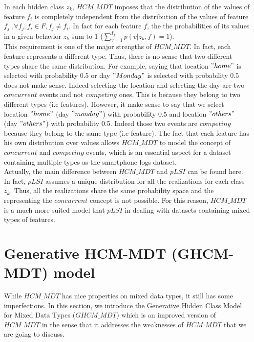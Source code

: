 In each hidden class $z_{k}$, $HCM\_MDT$ imposes that the distribution of the values of feature $f_{i}$ is completely independent from the distribution of the values of feature $f_{j}$ ,$\forall f_{j}, f_{i}\in F , f_{j}\neq f_{i}$. In fact for each feature $f$, the the probabilities of its values in a given behavior $z_{k}$ sum to $1$ ($\sum_{v=1}^{I_{f}}p(v|z_{k},f)=1$).
\\This requirement is one of the major strengths of $HCM\_MDT$. In fact, each feature represents a different type. Thus, there is no sense that two different types share the same distribution. For example, saying that location $"home"$ is selected with probability $0.5$ or day $"Monday"$ is selected with probability $0.5$ does not make sense. Indeed selecting the location and selecting the day are two $concurrent$ events and not $competing$ ones. This is because they belong to two different types (i.e features). However, it make sense to say that we select location $"home"$ (day $"monday"$) with probability 0.5 and location $"others"$ (day $"others"$) with probability 0.5. Indeed those two events are $competing$ because they belong to the same type (i.e feature). The fact that each feature has his own distribution over values allows $HCM\_MDT$ to model the concept of $concurrent$ and $competing$ events, which is an essential aspect for a dataset containing multiple types as the smartphone logs dataset.
\\Actually, the main difference between $HCM\_MDT$ and $pLSI$ can be found here. In fact, $pLSI$ assumes a unique distribution for all the realizations for each class $z_{k}$. Thus, all the realizations share the same probability space and the representing the $concurrent$ concept is not possible. For this reason, $HCM\_MDT$ is a much more suited model that $pLSI$ in dealing with datasets containing mixed types of features.






\section{Generative HCM-MDT (GHCM-MDT) model}
While $HCM\_MDT$ has nice properties on mixed data types, it still has some imperfections. In this section, we introduce the Generative Hidden Class Model for Mixed Data Types ($GHCM\_MDT$) which is an improved version of $HCM\_MDT$ in the sense that it addresses the weaknesses of $HCM\_MDT$ that we are going to discuss.

